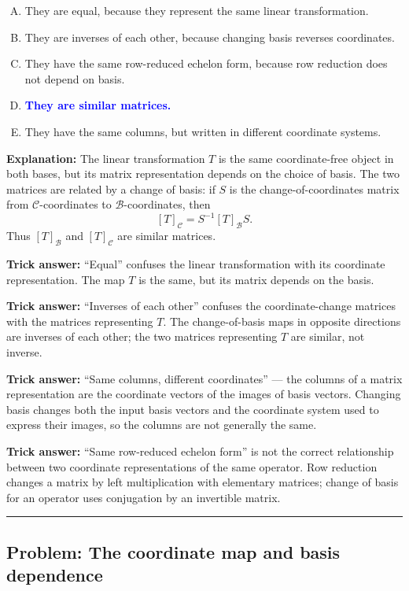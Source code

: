 \documentclass[12pt]{amsart}
\newcommand{\divider}{
  \vspace{-1em}
  \noindent
  \raisebox{-0.15ex}{\textbullet}%
  \hspace{0.5em}%
  \rule[0.5ex]{0.95\textwidth}{1.0pt}%
  \hspace{0.5em}%
  \raisebox{-0.15ex}{\textbullet}%
  \vspace{0em}
}
\begin{document}
\begin{enumerate}[(A)]
\item They are equal, because they represent the same linear transformation.
\item They are inverses of each other, because changing basis reverses coordinates.
\item They have the same row-reduced echelon form, because row reduction does not depend on basis.
\item \textcolor{blue}{\textbf{They are similar matrices.}}
\item They have the same columns, but written in different coordinate systems.
\end{enumerate}

\textbf{Explanation:}
The linear transformation $T$ is the same coordinate-free object in both
bases, but its matrix representation depends on the choice of basis. The
two matrices are related by a change of basis: if $S$ is the change-of-coordinates
matrix from $\mathcal{C}$-coordinates to $\mathcal{B}$-coordinates, then
$$[T]_{\mathcal{C}} = S^{-1}[T]_{\mathcal{B}}S.$$
Thus $[T]_{\mathcal{B}}$ and $[T]_{\mathcal{C}}$ are similar matrices.

\textbf{Trick answer:}
``Equal'' confuses the linear transformation with its coordinate
representation. The map $T$ is the same, but its matrix depends on the basis.

\textbf{Trick answer:}
``Inverses of each other'' confuses the coordinate-change matrices with the
matrices representing $T$. The change-of-basis maps in opposite directions
are inverses of each other; the two matrices representing $T$ are similar,
not inverse.

\textbf{Trick answer:}
``Same columns, different coordinates'' --- the columns of a matrix
representation are the coordinate vectors of the images of basis vectors.
Changing basis changes both the input basis vectors and the coordinate
system used to express their images, so the columns are not generally the
same.

\textbf{Trick answer:}
``Same row-reduced echelon form'' is not the correct relationship between
two coordinate representations of the same operator. Row reduction changes
a matrix by left multiplication with elementary matrices; change of basis
for an operator uses conjugation by an invertible matrix.

\divider

\subsection*{Problem: The coordinate map and basis dependence}
\end{document}
